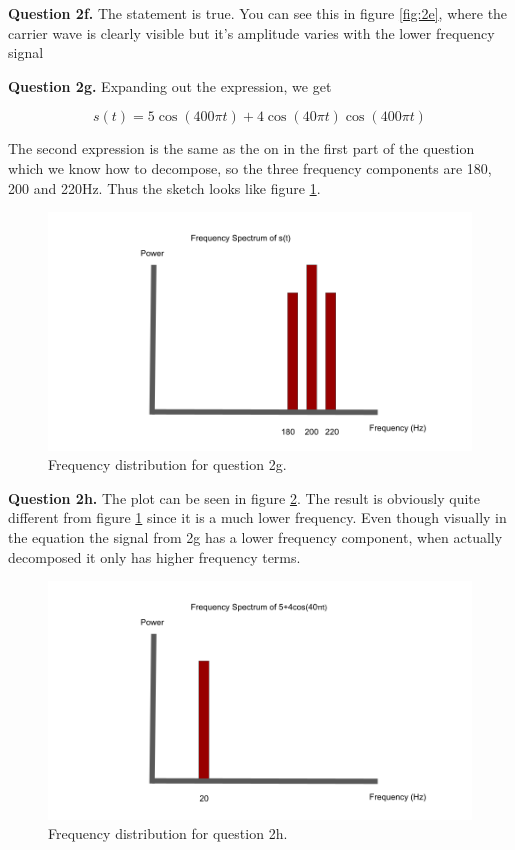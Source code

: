 \documentclass[letterpaper, reqno,11pt]{article}
\begin{document}
{\noindent\bf Question 2f.} The statement is true. You can see this in figure \ref{fig:2e}, where the carrier wave is clearly visible but it's amplitude varies with the lower frequency signal 

{\noindent\bf Question 2g.} Expanding out the expression, we get 

$$
    s(t) = 5\cos(400\pi t) + 4\cos(40\pi t)\cos(400\pi t)
$$

The second expression is the same as the on in the first part of the question which we know how to decompose, so the three frequency components are 180, 200 and 220Hz. Thus the sketch looks like figure \ref{fig:2g}. 

\begin{figure}[htbp]
\centering
\includegraphics[width=\textwidth]{2g}
\caption{Frequency distribution for question 2g. }
\label{fig:2g}
\end{figure}

{\noindent\bf Question 2h.} The plot can be seen in figure \ref{fig:2h}. The result is obviously quite different from figure \ref{fig:2g} since it is a much lower frequency. Even though visually in the equation the signal from 2g has a lower frequency component, when actually decomposed it only has higher frequency terms. 


\begin{figure}[htbp]
\centering
\includegraphics[width=\textwidth]{2h}
\caption{Frequency distribution for question 2h. }
\label{fig:2h}
\end{figure}
\end{document}
